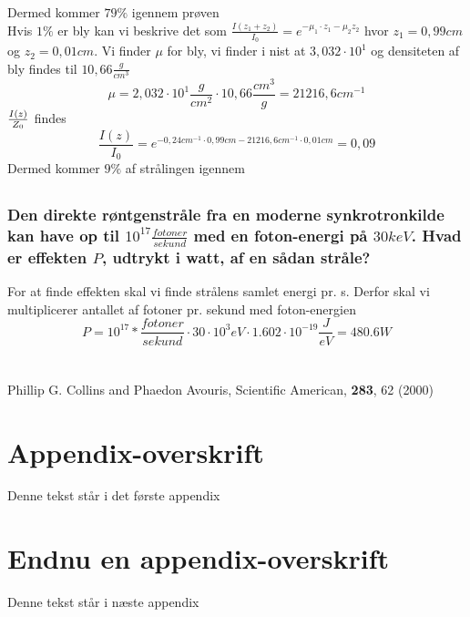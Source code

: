 \documentclass[a4paper,twoside]{article}
\begin{document}
    Dermed kommer $79\%$ igennem prøven\\
Hvis $1\%$ er bly kan vi beskrive det som $\frac{I(z_1+z_2)}{I_0}=e^{-\mu_1\cdot z_1-\mu_2 z_2}$ hvor $z_1=0,99cm$ og $z_2=0,01cm$. Vi finder $\mu$ for bly, vi finder i nist at $3,032\cdot10^1$ og densiteten af bly findes til $10,66\frac{g}{cm^3}$
\begin{equation*}
    \mu=2,032\cdot10^{1}\frac{g}{cm^2}\cdot10,66\frac{cm^3}{g}=21216,6cm^{-1}
\end{equation*}
$I(z)\over Z_0$ findes
\begin{equation*}
    \frac{I(z)}{I_0}=e^{-0,24cm^{-1}\cdot 0,99cm - 21216,6cm^{-1}\cdot 0,01cm}=0,09
\end{equation*}
Dermed kommer $9\%$ af strålingen igennem




\subsection{}
\subsubsection*{Den direkte røntgenstråle fra en moderne synkrotronkilde kan have op til $10^{17} \frac{fotoner}{sekund}$ med en foton-energi på $30keV$. Hvad er effekten $P$, udtrykt i watt, af en sådan stråle?}
For at finde effekten skal vi finde strålens samlet energi pr. s. Derfor skal vi multiplicerer antallet af fotoner pr. sekund med foton-energien 
\begin{equation*}
P=10^{17}*\frac{fotoner}{sekund}\cdot30\cdot10^{3}eV\cdot1.602\cdot10^{-19} \frac{J}{eV}=480.6W
\end{equation*}
    
\subsection{}


\section{}

\newpage

%

\begin{thebibliography}{} %
Phillip G. Collins and Phaedon Avouris, Scientific American, \textbf{283}, 62 (2000)
\end{thebibliography}

\newpage 

\appendix
\section{Appendix-overskrift}
Denne tekst står i det første appendix

\section{Endnu en appendix-overskrift}
Denne tekst står i næste appendix
\end{document}
